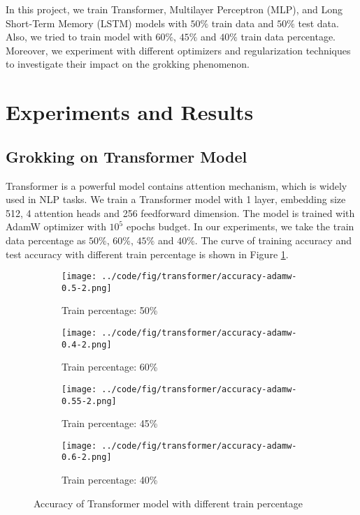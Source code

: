 \documentclass{article}
\begin{document}
In this project, we train Transformer, Multilayer Perceptron (MLP), and Long Short-Term Memory (LSTM) models with $50\%$ train data and $50\%$ test data. Also, we tried to train model with $60\%$, $45\%$ and $40\%$ train data percentage. Moreover, we experiment with different optimizers and regularization techniques to investigate their impact on the grokking phenomenon.

\section{Experiments and Results}

\subsection{Grokking on Transformer Model}

Transformer is a powerful model contains attention mechanism, which is widely used in NLP tasks. We train a Transformer model with 1 layer, embedding size 512, 4 attention heads and 256 feedforward dimension. The model is trained with AdamW optimizer with $10^5$ epochs budget. In our experiments, we take the train data percentage as $50\%$, $60\%$, $45\%$ and $40\%$. The curve of training accuracy and test accuracy with different train percentage is shown in Figure \ref{fig:transformer-accuracy}.

\begin{figure}[ht]
    \centering
    \begin{subfigure}{0.45\textwidth}
        \texttt{[image: ../code/fig/transformer/accuracy-adamw-0.5-2.png]}
        \caption{Train percentage: 50\%}
    \end{subfigure}
    \begin{subfigure}{0.45\textwidth}
        \texttt{[image: ../code/fig/transformer/accuracy-adamw-0.4-2.png]}
        \caption{Train percentage: 60\%}
    \end{subfigure}
    \begin{subfigure}{0.45\textwidth}
        \texttt{[image: ../code/fig/transformer/accuracy-adamw-0.55-2.png]}
        \caption{Train percentage: 45\%}
    \end{subfigure}
    \begin{subfigure}{0.45\textwidth}
        \texttt{[image: ../code/fig/transformer/accuracy-adamw-0.6-2.png]}
        \caption{Train percentage: 40\%}
    \end{subfigure}
    \caption{Accuracy of Transformer model with different train percentage}
    \label{fig:transformer-accuracy}
\end{figure}
\end{document}
